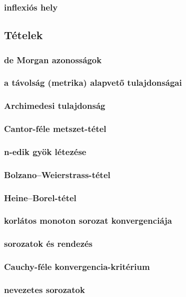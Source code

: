\documentclass[12pt]{article}
\begin{document}
\subsubsection{inflexiós hely}


\subsection{Tételek}

\subsubsection{de Morgan azonosságok}
\subsubsection{a távolság (metrika) alapvető tulajdonságai}
\subsubsection{Archimedesi tulajdonság}
\subsubsection{Cantor-féle metszet-tétel}
\subsubsection{n-edik gyök létezése}
\subsubsection{Bolzano–Weierstrass-tétel}
\subsubsection{Heine–Borel-tétel}
\subsubsection{korlátos monoton sorozat konvergenciája}
\subsubsection{sorozatok és rendezés}
\subsubsection{Cauchy-féle konvergencia-kritérium}
\subsubsection{nevezetes sorozatok}
\end{document}
